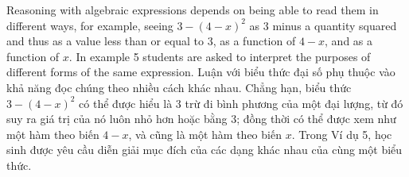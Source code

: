 \documentclass[
  10pt,
  a4paper,
  landscape,
  twoside,
  openany
]{scrbook}
\newcommand{\EN}[1]{#1}
\newcommand{\VI}[1]{#1}
\newcommand{\NOTE}[1]{#1}
\newcounter{example}
\begin{document}
\TriPara
{
\EN{Reasoning with algebraic expressions depends on being able to read them in different ways, for example, seeing $3 - (4 - x)^2$ as 3 minus a quantity squared and thus as a value less than or equal to 3, as a function of $4 - x$, and as a function of $x$. In example 5 students are asked to interpret the purposes of different forms of the same expression.}
}
{
\VI{Luận với biểu thức đại số phụ thuộc vào khả năng đọc chúng theo nhiều cách khác nhau. Chẳng hạn, biểu thức $3 - (4 - x)^2$ có thể được hiểu là $3$ trừ đi bình phương của một đại lượng, từ đó suy ra giá trị của nó luôn nhỏ hơn hoặc bằng $3$; đồng thời có thể được xem như một hàm theo biến $4 - x$, và cũng là một hàm theo biến $x$. Trong Ví dụ 5, học sinh được yêu cầu diễn giải mục đích của các dạng khác nhau của cùng một biểu thức.}
}
{
\NOTE{}
}
\end{document}
